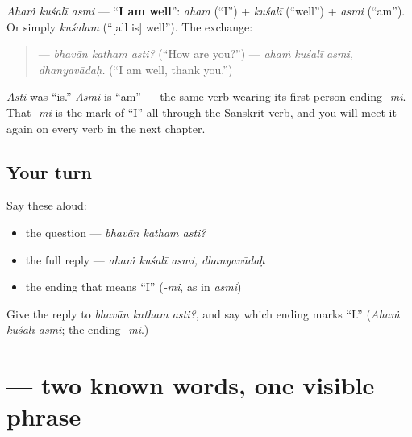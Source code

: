 \begin{cousinweb}
\emph{Ahaṁ kuśalī asmi} — \textquotedblleft{}\textbf{I am well}\textquotedblright{}: \emph{aham} (\textquotedblleft{}I\textquotedblright{}) + \emph{kuśalī} (\textquotedblleft{}well\textquotedblright{}) + \emph{asmi} (\textquotedblleft{}am\textquotedblright{}). Or simply \emph{kuśalam} (\textquotedblleft{}{[}all is{]} well\textquotedblright{}). The exchange:

\begin{quote}
— \emph{bhavān katham asti?} (\textquotedblleft{}How are you?\textquotedblright{}) — \emph{ahaṁ kuśalī asmi, dhanyavādaḥ.} (\textquotedblleft{}I am well, thank you.\textquotedblright{})
\end{quote}
\end{cousinweb}

\begin{grammarlens}[title={Grammar Lens: \emph{asmi} is the \textquotedblleft{}I\textquotedblright{} form of \textquotedblleft{}to be\textquotedblright{}}]
\emph{Asti} was \textquotedblleft{}is.\textquotedblright{} \emph{Asmi} is \textquotedblleft{}am\textquotedblright{} — the same verb wearing its first-person ending \emph{-mi}. That \emph{-mi} is the mark of \textquotedblleft{}I\textquotedblright{} all through the Sanskrit verb, and you will meet it again on every verb in the next chapter.
\end{grammarlens}

\subsection*{Your turn}
Say these aloud:

\begin{itemize}
\raggedright
  \item the question — \emph{bhavān katham asti?}
  \item the full reply — \emph{ahaṁ kuśalī asmi, dhanyavādaḥ}
  \item the ending that means \textquotedblleft{}I\textquotedblright{} (\emph{-mi}, as in \emph{asmi})
\end{itemize}

\begin{tcolorbox}[breakable,colback=teal!4,colframe=teal!35!black,title={Before you move on}]
Give the reply to \emph{bhavān katham asti?}, and say which ending marks \textquotedblleft{}I.\textquotedblright{} (\emph{Ahaṁ kuśalī asmi}; the ending \emph{-mi}.)
\end{tcolorbox}
\section[\texorpdfstring{\sk{मम} \sk{नाम} (mama nāma)}{मम नाम (mama nāma)}]{  — two known words, one visible phrase}

